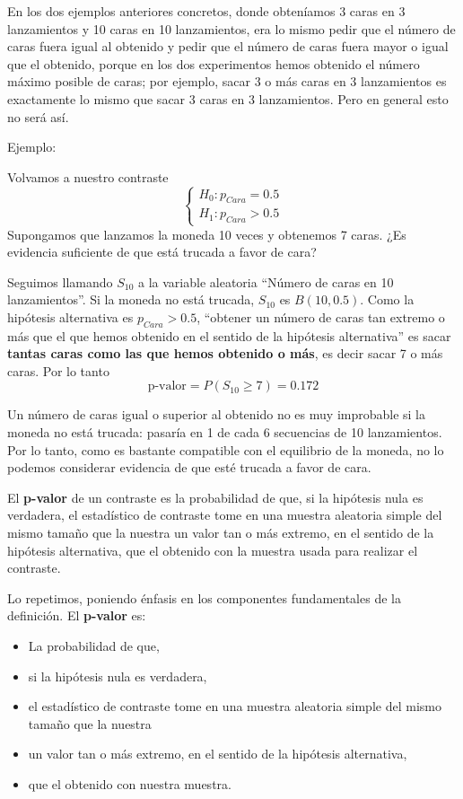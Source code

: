 \documentclass[
  spanish,
  letterpaper,
  DIV=11,
  numbers=noendperiod]{scrreprt}
\providecommand{\tightlist}{%
  \setlength{\itemsep}{0pt}\setlength{\parskip}{0pt}}
\begin{document}
En los dos ejemplos anteriores concretos, donde obteníamos 3 caras en 3
lanzamientos y 10 caras en 10 lanzamientos, era lo mismo pedir que el
número de caras fuera igual al obtenido y pedir que el número de caras
fuera mayor o igual que el obtenido, porque en los dos experimentos
hemos obtenido el número máximo posible de caras; por ejemplo, sacar 3 o
más caras en 3 lanzamientos es exactamente lo mismo que sacar 3 caras en
3 lanzamientos. Pero en general esto no será así.

Ejemplo:

Volvamos a nuestro contraste \[
\left\{\begin{array}{ll} 
H_{0}:p_{\mathit{Cara}}= 0.5\\ 
H_{1}:p_{\mathit{Cara}}> 0.5
\end{array}
\right.
\] Supongamos que lanzamos la moneda 10 veces y obtenemos 7 caras. ¿Es
evidencia suficiente de que está trucada a favor de cara?

Seguimos llamando \(S_{10}\) a la variable aleatoria ``Número de caras
en 10 lanzamientos''. Si la moneda no está trucada, \(S_{10}\) es
\(B(10,0.5)\). Como la hipótesis alternativa es
\(p_{\mathit{Cara}}> 0.5\), ``obtener un número de caras tan extremo o
más que el que hemos obtenido en el sentido de la hipótesis
alternativa'' es sacar \textbf{tantas caras como las que hemos obtenido
o más}, es decir sacar 7 o más caras. Por lo tanto \[
\text{p-valor}=P(S_{10}\geqslant 7)=0.172
\]

Un número de caras igual o superior al obtenido no es muy improbable si
la moneda no está trucada: pasaría en 1 de cada 6 secuencias de 10
lanzamientos. Por lo tanto, como es bastante compatible con el
equilibrio de la moneda, no lo podemos considerar evidencia de que esté
trucada a favor de cara.

El \textbf{p-valor} de un contraste es la probabilidad de que, si la
hipótesis nula es verdadera, el estadístico de contraste tome en una
muestra aleatoria simple del mismo tamaño que la nuestra un valor tan o
más extremo, en el sentido de la hipótesis alternativa, que el obtenido
con la muestra usada para realizar el contraste.

Lo repetimos, poniendo énfasis en los componentes fundamentales de la
definición. El \textbf{p-valor} es:

\begin{itemize}
\tightlist
\item
  La probabilidad de que,
\item
  si la hipótesis nula es verdadera,
\item
  el estadístico de contraste tome en una muestra aleatoria simple del
  mismo tamaño que la nuestra
\item
  un valor tan o más extremo, en el sentido de la hipótesis alternativa,
\item
  que el obtenido con nuestra muestra.
\end{itemize}
\end{document}
